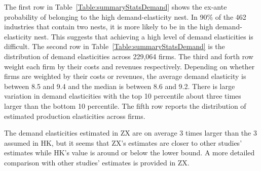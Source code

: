 \documentclass[12pt]{article}
\begin{document}
The first row in Table~\ref{Table:summaryStatsDemand} shows the ex-ante probability of belonging to the high demand-elasticity nest. In 90\% of the 462 industries that contain two nests, it is more likely to be in the high demand-elasticity nest. This suggests that achieving a high level of demand elasticities is difficult. The second row in Table~\ref{Table:summaryStatsDemand} is the distribution of demand elasticities across 229,064 firms. The third and forth row weight each firm by their costs and revenues respectively. Depending on whether firms are weighted by their costs or revenues, the average demand elasticity is between 8.5 and 9.4 and the median is between 8.6 and 9.2. There is large variation in demand elasticities with the top 10 percentile about three times larger than the bottom 10 percentile. The fifth row reports the distribution of estimated production elasticities across firms. %

The demand elasticities estimated in ZX are on average 3 times larger than the 3 assumed in HK, but it seems that ZX's estimates are closer to other studies' estimates while HK's value is around or below the lower bound. A more detailed comparison with other studies' estimates is provided in ZX.

\end{document}
